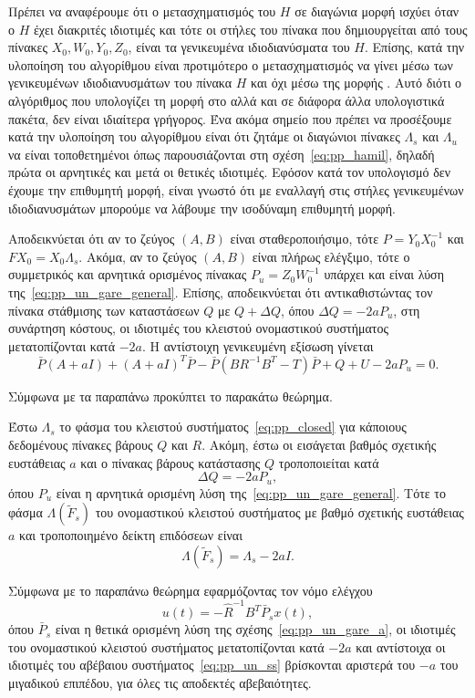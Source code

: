 Πρέπει να αναφέρουμε ότι ο μετασχηματισμός του \( H \) σε διαγώνια μορφή ισχύει
όταν ο \( H \) έχει διακριτές ιδιοτιμές και τότε οι στήλες του πίνακα που
δημιουργείται από τους πίνακες \( X_0, W_0, Y_0, Z_0 \), είναι τα γενικευμένα
ιδιοδιανύσματα του \( H \). Επίσης, κατά την υλοποίηση του αλγορίθμου είναι προτιμότερο
ο μετασχηματισμός να γίνει μέσω των γενικευμένων ιδιοδιανυσμάτων του πίνακα
\( H \) και όχι μέσω της μορφής . Αυτό διότι ο αλγόριθμος που
υπολογίζει τη μορφή  στο  αλλά και σε διάφορα άλλα υπολογιστικά
πακέτα, δεν είναι ιδιαίτερα γρήγορος.  Ένα ακόμα σημείο που πρέπει να προσέξουμε
κατά την υλοποίηση του αλγορίθμου είναι ότι ζητάμε οι διαγώνιοι πίνακες
\( \Lambda_s \) και \( \Lambda_u \) να είναι τοποθετημένοι όπως παρουσιάζονται
στη σχέση~\eqref{eq:pp_hamil}, δηλαδή πρώτα οι αρνητικές και μετά οι θετικές
ιδιοτιμές. Εφόσον κατά τον υπολογισμό δεν έχουμε την επιθυμητή μορφή, είναι γνωστό
ότι με εναλλαγή στις στήλες γενικευμένων ιδιοδιανυσμάτων μπορούμε να λάβουμε την
ισοδύναμη επιθυμητή μορφή.

Αποδεικνύεται ότι αν το ζεύγος \( (A, B) \) είναι σταθεροποιήσιμο, τότε
\( P = Y_0 X_0^{-1} \) και \( FX_0 = X_0\Lambda_s \). Ακόμα, αν το ζεύγος \( (A, B) \)
είναι πλήρως ελέγξιμο, τότε ο συμμετρικός και αρνητικά ορισμένος πίνακας
\( P_u = Z_0 W_0^{-1} \) υπάρχει και είναι λύση της~\eqref{eq:pp_un_gare_general}.
Επίσης, αποδεικνύεται ότι αντικαθιστώντας τον πίνακα στάθμισης των καταστάσεων
\( Q \) με \( Q + \Delta Q \), όπου \( \Delta Q = - 2aP_u \), στη συνάρτηση κόστους,
οι ιδιοτιμές του κλειστού ονομαστικού συστήματος μετατοπίζονται κατά \( -2a \).
Η αντίστοιχη γενικευμένη εξίσωση  γίνεται
\begin{equation}\label{eq:pp_un_gare_a}
    \bar{P}(A + aI) + (A + aI)^{T}\bar{P} - \bar{P}(BR^{-1}B^{T} - T)\bar{P} +
    Q + U - 2aP_u= 0.
\end{equation}

Σύμφωνα με τα παραπάνω προκύπτει το παρακάτω θεώρημα.
\begin{theorem}
    Έστω \( \Lambda_s \) το φάσμα του κλειστού συστήματος~\eqref{eq:pp_closed}
    για κάποιους δεδομένους πίνακες βάρους \( Q \) και \( R \). Ακόμη, έστω οι
    εισάγεται βαθμός σχετικής ευστάθειας \( a \) και ο πίνακας βάρους
    κατάστασης \( Q \) τροποποιείται κατά
    \[
        \Delta Q = -2aP_u,
    \]
    όπου \( P_u \) είναι η αρνητικά ορισμένη λύση
    της~\eqref{eq:pp_un_gare_general}. Τότε το φάσμα \( \Lambda(\tilde{F}_s) \)
    του ονομαστικού κλειστού συστήματος με βαθμό σχετικής ευστάθειας \( a \)
    και τροποποιημένο δείκτη επιδόσεων είναι
    \[
        \Lambda(\tilde{F}_s) = \Lambda_s - 2aI.
    \]
\end{theorem}
Σύμφωνα με το παραπάνω θεώρημα εφαρμόζοντας τον νόμο ελέγχου
\[
    u(t) = -\hat{R}^{-1}B^T\bar{P}_sx(t),
\]
όπου \( \bar{P}_s \) είναι η θετικά ορισμένη λύση της
σχέσης~\eqref{eq:pp_un_gare_a}, οι ιδιοτιμές του ονομαστικού κλειστού
συστήματος μετατοπίζονται κατά \( -2a \) και αντίστοιχα οι ιδιοτιμές του
αβέβαιου συστήματος~\eqref{eq:pp_un_ss} βρίσκονται αριστερά του \( -a \) του
μιγαδικού επιπέδου, για όλες τις αποδεκτές αβεβαιότητες.

